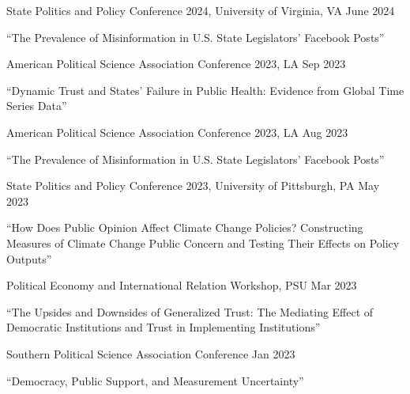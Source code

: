 \documentclass[10.5pt,]{article}
\providecommand{\tightlist}{%
	\setlength{\itemsep}{0pt}\setlength{\parskip}{0pt}}
\renewenvironment{itemize}{
	\begin{list}{}{
			\setlength{\leftmargin}{1.5em}
		}
	}{
	\end{list}
}
\begin{document}
\begin{itemize}
  \begin{itemize}
  \tightlist
  \item
    State Politics and Policy Conference 2024, University of Virginia,
    VA \hfill June 2024
  \end{itemize}
\item
  ``The Prevalence of Misinformation in U.S. State Legislators' Facebook
  Posts''

  \begin{itemize}
  \tightlist
  \item
    American Political Science Association Conference 2023, LA
    \hfill Sep 2023
  \end{itemize}
\item
  ``Dynamic Trust and States' Failure in Public Health: Evidence from
  Global Time Series Data''

  \begin{itemize}
  \tightlist
  \item
    American Political Science Association Conference 2023, LA
    \hfill Aug 2023
  \end{itemize}
\item
  ``The Prevalence of Misinformation in U.S. State Legislators' Facebook
  Posts''

  \begin{itemize}
  \tightlist
  \item
    State Politics and Policy Conference 2023, University of Pittsburgh,
    PA \hfill May 2023
  \end{itemize}
\item
  ``How Does Public Opinion Affect Climate Change Policies? Constructing
  Measures of Climate Change Public Concern and Testing Their Effects on
  Policy Outputs''

  \begin{itemize}
  \tightlist
  \item
    Political Economy and International Relation Workshop, PSU
    \hfill Mar 2023
  \end{itemize}
\item
  ``The Upsides and Downsides of Generalized Trust: The Mediating Effect
  of Democratic Institutions and Trust in Implementing Institutions''

  \begin{itemize}
  \tightlist
  \item
    Southern Political Science Association Conference \hfill Jan 2023
  \end{itemize}
\item
  ``Democracy, Public Support, and Measurement Uncertainty''


\end{itemize}
\end{document}
